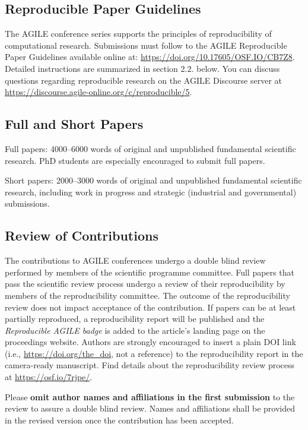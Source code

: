 \documentclass[agile, final]{copernicus-agile}
\begin{document}
\subsection{Reproducible Paper Guidelines}
The AGILE conference series supports the principles of reproducibility of computational research. Submissions must follow to the AGILE Reproducible Paper Guidelines available online at: \url{https://doi.org/10.17605/OSF.IO/CB7Z8}. Detailed instructions are summarized in section 2.2. below. You can discuss questions regarding reproducible research on the AGILE Discourse server at \url{https://discourse.agile-online.org/c/reproducible/5}.

\subsection{Full and Short Papers}
Full papers: 4000--6000 words of original and unpublished fundamental scientific research. PhD students are especially encouraged to submit full papers.

Short papers: 2000--3000 words of original and unpublished fundamental scientific research, including work in progress and strategic (industrial and governmental) submissions.

\subsection{Review of Contributions}
The contributions to AGILE conferences undergo a double blind review performed by members of the scientific programme committee. Full papers that pass the scientific review process undergo a review of their reproducibility by members of the reproducibility committee. The outcome of the reproducibility review does not impact acceptance of the contribution. If papers can be at least partially reproduced, a reproducibility report will be published and the \textit{Reproducible AGILE badge} is added to the article’s landing page on the proceedings website. Authors are strongly encouraged to insert a plain DOI link (i.e., \url{https://doi.org/the_doi}, not a reference) to the reproducibility report in the camera-ready manuscript. Find details about the reproducibility review process at \url{https://osf.io/7rjpe/}.

Please \textbf{omit author names and affiliations in the first submission} to the review to assure a double blind review. Names and affiliations shall be provided in the revised version once the contribution has been accepted.
\end{document}
